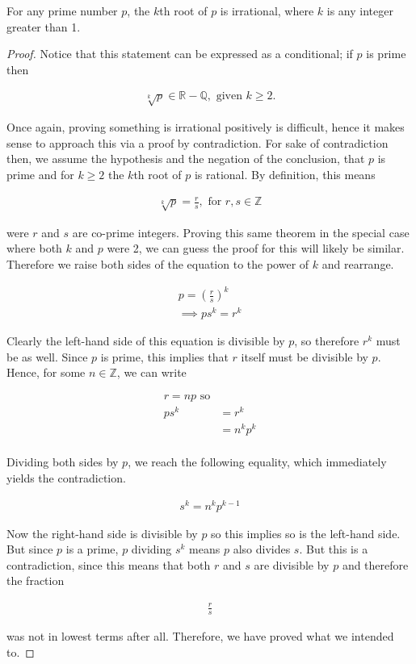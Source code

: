 \documentclass[twoside]{report}
\begin{document}
\vspace{\baselineskip}
\begin{theorem}
	For any prime number $p$, the $k$th root of $p$ is irrational, where $k$ is any integer greater than 1.
\end{theorem}
\begin{proof}
	Notice that this statement can be expressed as a conditional; if $p$ is prime then 
	
	\begin{align*}
		\sqrt[k]{p} \in \mathbb{R} - \mathbb{Q}, \text{ given } k \ge 2.
	\end{align*}
	
	Once again, proving something is irrational positively is difficult, hence it makes sense to approach this via a proof by contradiction. For sake of contradiction then, we assume the hypothesis and the negation of the conclusion, that $p$ is prime and for $k \ge 2$ the $k$th root of $p$ is rational. By definition, this means

	\begin{align*}
		\sqrt[k]{p} = \frac{r}{s}, \text{ for } r, s \in \mathbb{Z}
	\end{align*}
	
	were $r$ and $s$ are co-prime integers. Proving this same theorem in the special case where both $k$ and $p$ were 2, we can guess the proof for this will likely be similar. Therefore we raise both sides of the equation to the power of $k$ and rearrange.
	
	\begin{align*}
		p = \left( \frac{r}{s} \right)^k \\
		\implies p s^k = r^k
	\end{align*}
	
	Clearly the left-hand side of this equation is divisible by $p$,  so therefore $r^k$ must be as well. Since $p$ is prime, this implies that $r$ itself must be divisible by $p$. Hence, for some $n \in \mathbb{Z}$, we can write
	
	\begin{align*}
		r = np \text{ so} \\
		p s^k &= r^k \\
		&= n^k p^k \\
	\end{align*}
	
	Dividing both sides by $p$, we reach the following equality, which immediately yields the contradiction.
	
	\begin{align*}
		s^k = n^k p^{k - 1}
	\end{align*}
	
	Now the right-hand side is divisible by $p$ so this implies so is the left-hand side. But since $p$ is a prime, $p$ dividing $s^k$ means $p$ also divides $s$. But this is a contradiction, since this means that both $r$ and $s$ are divisible by $p$ and therefore the fraction
	
	\begin{align*}
		\frac{r}{s}
	\end{align*}
	
	was not in lowest terms after all. Therefore, we have proved what we intended to.
\end{proof}
\end{document}
